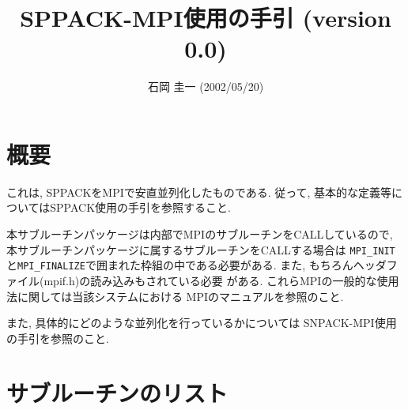 %
%

\title{SPPACK-MPI使用の手引 (version 0.0)}
\author{石岡 圭一  (2002/05/20)}
\date{}



\maketitle

\section{概要}

これは, SPPACKをMPIで安直並列化したものである.
従って, 基本的な定義等についてはSPPACK使用の手引を参照すること.

本サブルーチンパッケージは内部でMPIのサブルーチンをCALLしているので,
本サブルーチンパッケージに属するサブルーチンをCALLする場合は
{\tt MPI\_INIT}と{\tt MPI\_FINALIZE}で囲まれた枠組の中である必要がある.
また, もちろんヘッダファイル(mpif.h)の読み込みもされている必要
がある. これらMPIの一般的な使用法に関しては当該システムにおける
MPIのマニュアルを参照のこと.
 
また, 具体的にどのような並列化を行っているかについては
SNPACK-MPI使用の手引を参照のこと.


\section{サブルーチンのリスト}

